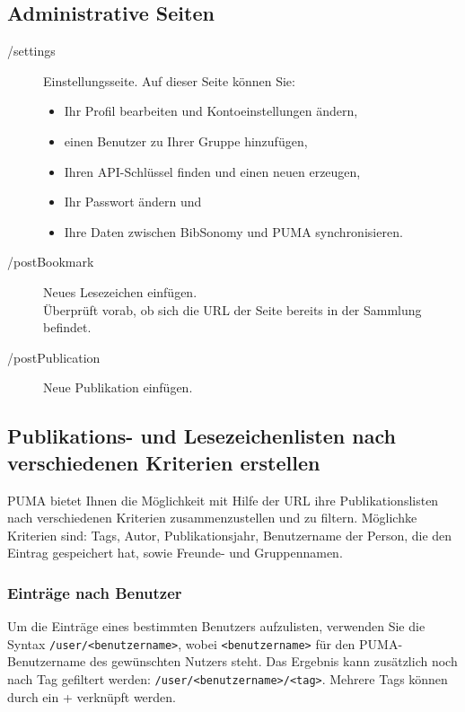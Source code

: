 \subsection{Administrative Seiten}
\label{subsec:adminSeiten}
\begin{description}
\item [/settings]  Einstellungsseite. Auf dieser Seite können Sie:
    \begin{itemize}
        \item Ihr Profil bearbeiten und Kontoeinstellungen ändern,
        \item einen Benutzer zu Ihrer Gruppe hinzufügen,
        \item Ihren API-Schlüssel finden und einen neuen erzeugen,
        \item Ihr Passwort ändern und
        \item Ihre Daten zwischen BibSonomy und PUMA synchronisieren.
    \end{itemize}
    \item [/postBookmark]    Neues Lesezeichen einfügen. \hfill \\Überprüft vorab, ob sich die URL der Seite bereits in der Sammlung befindet.
    \item [/postPublication]    Neue Publikation einfügen. 
\end{description}

\subsection{Publikations- und Lesezeichenlisten nach verschiedenen Kriterien erstellen}
\label{subsec:suchenMitUrlSyntax}
PUMA bietet Ihnen die Möglichkeit mit Hilfe der URL ihre Publikationslisten nach verschiedenen Kriterien zusammenzustellen und zu filtern. Möglichke Kriterien sind: Tags, Autor, Publikationsjahr, Benutzername der Person, die den Eintrag gespeichert hat, sowie Freunde- und Gruppennamen. \newline
\newline

\subsubsection{Einträge nach Benutzer}
\label{sss:nachBenutzer}

Um die Einträge eines bestimmten Benutzers aufzulisten, verwenden Sie die Syntax \texttt{/user/<benutzername>}, wobei \texttt{<benutzername>} für den PUMA-Benutzername des gewünschten Nutzers steht. Das Ergebnis kann zusätzlich noch nach Tag gefiltert werden: \texttt{/user/<benutzername>/<tag>}. Mehrere Tags können durch ein + verknüpft werden.

